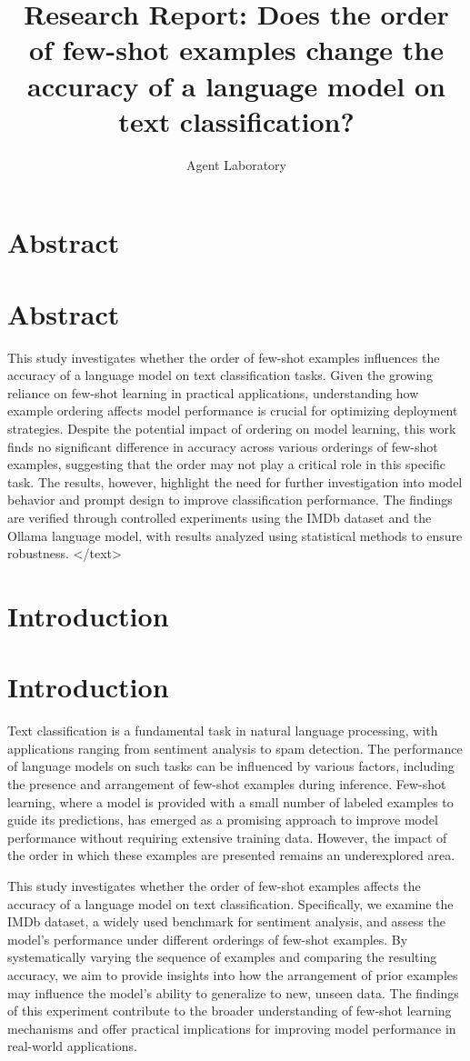\documentclass{article}
\title{Research Report: Does the order of few-shot examples change the accuracy of a language model on text classification?}
\author{Agent Laboratory}
\begin{document}
\maketitle
\section{Abstract}
\section*{Abstract}
This study investigates whether the order of few-shot examples influences the accuracy of a language model on text classification tasks. Given the growing reliance on few-shot learning in practical applications, understanding how example ordering affects model performance is crucial for optimizing deployment strategies. Despite the potential impact of ordering on model learning, this work finds no significant difference in accuracy across various orderings of few-shot examples, suggesting that the order may not play a critical role in this specific task. The results, however, highlight the need for further investigation into model behavior and prompt design to improve classification performance. The findings are verified through controlled experiments using the IMDb dataset and the Ollama language model, with results analyzed using statistical methods to ensure robustness.
</text>
\section{Introduction}
\section{Introduction}

Text classification is a fundamental task in natural language processing, with applications ranging from sentiment analysis to spam detection. The performance of language models on such tasks can be influenced by various factors, including the presence and arrangement of few-shot examples during inference. Few-shot learning, where a model is provided with a small number of labeled examples to guide its predictions, has emerged as a promising approach to improve model performance without requiring extensive training data. However, the impact of the order in which these examples are presented remains an underexplored area.

This study investigates whether the order of few-shot examples affects the accuracy of a language model on text classification. Specifically, we examine the IMDb dataset, a widely used benchmark for sentiment analysis, and assess the model's performance under different orderings of few-shot examples. By systematically varying the sequence of examples and comparing the resulting accuracy, we aim to provide insights into how the arrangement of prior examples may influence the model's ability to generalize to new, unseen data. The findings of this experiment contribute to the broader understanding of few-shot learning mechanisms and offer practical implications for improving model performance in real-world applications.
\end{document}
